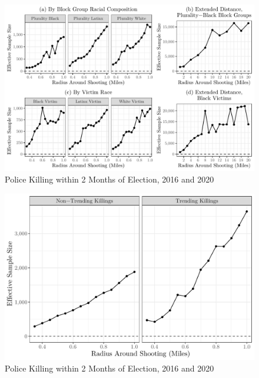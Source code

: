 \documentclass[
  12pt,
]{article}
\begin{document}
\begin{figure}[h]

{\centering \includegraphics{shoot_to_files/figure-latex/samples-bo-1} 

}

\caption{\label{fig:map}Police Killing within 2 Months of Election, 2016 and 2020}\label{fig:samples-bo}
\end{figure}

\begin{figure}[h]

{\centering \includegraphics{shoot_to_files/figure-latex/samples-trend-1} 

}

\caption{\label{fig:map}Police Killing within 2 Months of Election, 2016 and 2020}\label{fig:samples-trend}
\end{figure}
\end{document}
